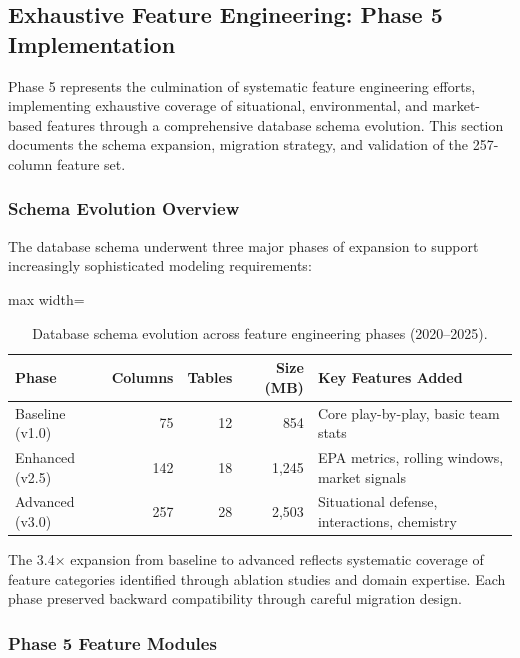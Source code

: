 \subsection{Exhaustive Feature Engineering: Phase 5 Implementation}
\label{subsec:phase5-features}

Phase 5 represents the culmination of systematic feature engineering efforts, implementing exhaustive coverage of situational, environmental, and market-based features through a comprehensive database schema evolution. This section documents the schema expansion, migration strategy, and validation of the 257-column feature set.

\subsubsection{Schema Evolution Overview}

The database schema underwent three major phases of expansion to support increasingly sophisticated modeling requirements:

\begin{table}[h]
  \centering
  \small
  \caption{Database schema evolution across feature engineering phases (2020--2025).}
  \label{tab:schema-evolution}
  \begin{adjustbox}{max width=\textwidth}
  \begin{tabular}{@{} l r r r l @{}}
    \toprule
    \textbf{Phase} & \textbf{Columns} & \textbf{Tables} & \textbf{Size (MB)} & \textbf{Key Features Added} \\
    \midrule
    Baseline (v1.0) & 75 & 12 & 854 & Core play-by-play, basic team stats \\
    Enhanced (v2.5) & 142 & 18 & 1,245 & EPA metrics, rolling windows, market signals \\
    Advanced (v3.0) & 257 & 28 & 2,503 & Situational defense, interactions, chemistry \\
    \bottomrule
  \end{tabular}
  \end{adjustbox}
\end{table}

The 3.4× expansion from baseline to advanced reflects systematic coverage of feature categories identified through ablation studies and domain expertise. Each phase preserved backward compatibility through careful migration design.

\subsubsection{Phase 5 Feature Modules}

